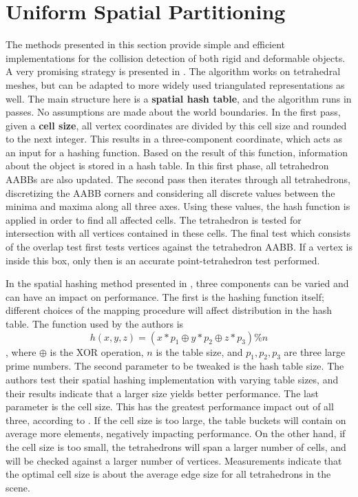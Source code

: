 






\section{Uniform Spatial Partitioning}
\label{sec:usp}

The methods presented in this section provide simple and efficient implementations for the collision detection of both rigid and deformable objects. A very promising strategy is presented in \citep{thm03}. The algorithm works on tetrahedral meshes, but can be adapted to more widely used triangulated representations as well. The main structure here is a \textbf{spatial hash table}, and the algorithm runs in passes. No assumptions are made about the world boundaries. In the first pass, given a \textbf{cell size}, all vertex coordinates are divided by this cell size and rounded to the next integer. This results in a three-component coordinate, which acts as an input for a hashing function. Based on the result of this function, information about the object is stored in a hash table. In this first phase, all tetrahedron AABBs are also updated. The second pass then iterates through all tetrahedrons, discretizing the AABB corners and considering all discrete values between the minima and maxima along all three axes. Using these values, the hash function is applied in order to find all affected cells. The tetrahedron is tested for intersection with all vertices contained in these cells. The final test which consists of the overlap test first tests vertices against the tetrahedron AABB. If a vertex is inside this box, only then is an accurate point-tetrahedron test performed.

In the spatial hashing method presented in \citep{thm03}, three components can be varied and can have an impact on performance. The first is the hashing function itself; different choices of the mapping procedure will affect distribution in the hash table. The function used by the authors is \[h(x, y, z) = (x * p_{1} \oplus y * p_{2} \oplus  z * p_{3}) \% n \], where $\oplus$ is the XOR operation, $n$ is the table size, and $p_{1}, p_{2}, p_{3}$ are three large prime numbers. The second parameter to be tweaked is the hash table size. The authors test their spatial hashing implementation with varying table sizes, and their results indicate that a larger size yields better performance. The last parameter is the cell size. This has the greatest performance impact out of all three, according to \citep{thm03}. If the cell size is too large, the table buckets will contain on average more elements, negatively impacting performance. On the other hand, if the cell size is too small, the tetrahedrons will span a larger number of cells, and will be checked against a larger number of vertices. Measurements indicate that the optimal cell size is about the average edge size for all tetrahedrons in the scene.



